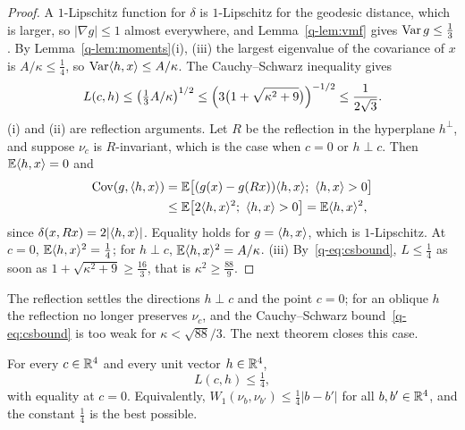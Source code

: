 \begin{proof}
A $1$-Lipschitz function for $\delta$ is $1$-Lipschitz for the geodesic
distance, which is larger, so $|\nabla g|\le1$ almost everywhere, and
Lemma~\ref{q-lem:vmf} gives $\operatorname{Var} g\le\frac13$. By Lemma~\ref{q-lem:moments}(i),
(iii) the largest eigenvalue of the covariance of $x$ is $A/\kappa\le\frac14$,
so $\operatorname{Var}\langle h,x\rangle\le A/\kappa$. The Cauchy--Schwarz inequality gives
\begin{equation}\label{q-eq:csbound}
L(c,h)\le\bigl(\tfrac13A/\kappa\bigr)^{1/2}\le\Bigl(3\bigl(1+
\sqrt{\kappa^2+9}\bigr)\Bigr)^{-1/2}\le\frac1{2\sqrt3}.
\end{equation}
(i) and (ii) are reflection arguments. Let $R$ be the reflection in the
hyperplane $h^\perp$, and suppose $\nu_c$ is $R$-invariant, which is the case
when $c=0$ or $h\perp c$. Then $\mathbb{E}\langle h,x\rangle=0$ and
\[
\begin{aligned}
\operatorname{Cov}(g,\langle h,x\rangle)&=\mathbb{E}\bigl[(g(x)-g(Rx))\langle h,x\rangle;\ \langle h,x\rangle>0\bigr]\\
&\le\mathbb{E}\bigl[2\langle h,x\rangle^2;\ \langle h,x\rangle>0\bigr]=\mathbb{E}\langle h,x\rangle^2,
\end{aligned}
\]
since $\delta(x,Rx)=2|\langle h,x\rangle|$. Equality holds for $g=\langle h,x\rangle$, which is
$1$-Lipschitz. At $c=0$, $\mathbb{E}\langle h,x\rangle^2=\frac14$; for $h\perp c$, $\mathbb{E}\langle h,x\rangle^2=A/\kappa$. (iii) By~\eqref{q-eq:csbound}, $L\le\frac14$ as soon as
$1+\sqrt{\kappa^2+9}\ge\frac{16}3$, that is $\kappa^2\ge\frac{88}9$.
\end{proof}

The reflection settles the directions
$h\perp c$ and the point $c=0$; for an oblique $h$ the reflection no longer
preserves $\nu_c$, and the Cauchy--Schwarz bound~\eqref{q-eq:csbound} is too
weak for $\kappa<\sqrt{88}/3$. The next theorem closes this case.

\begin{theorem}\label{q-thm:quarter}
For every $c\in\mathbb{R}^4$ and every unit vector $h\in\mathbb{R}^4$,
\[
L(c,h)\le\tfrac14 ,
\]
with equality at $c=0$. Equivalently, $W_1(\nu_b,\nu_{b'})\le\frac14|b-b'|$
for all $b,b'\in\mathbb{R}^4$, and the constant $\frac14$ is the best possible.
\end{theorem}

